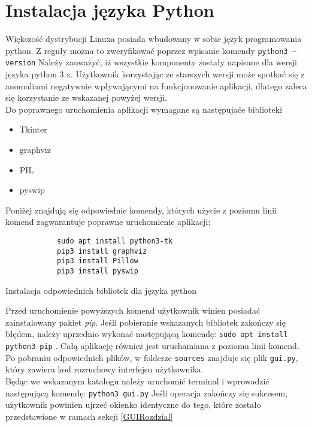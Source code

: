 \section{Instalacja języka Python}
    \label{InstallPython}
    Większość dystrybucji Linuxa posiada wbudowany w sobie język programowania python. Z reguły można to zweryfikować poprzez wpisanie komendy 
    \texttt{python3 --version}
    Należy zauważyć, iż wszystkie komponenty zostały napisane dla wersji języka python 3.x. Użytkownik korzystając ze starszych wersji 
    może spotkać się z anomaliami negatywnie wpływającymi na funkcjonowanie aplikacji, dlatego zaleca się korzystanie ze wskazanej powyżej wersji. \\
    Do poprawnego uruchomienia aplikacji wymagane są następujaće biblioteki 
    \begin{itemize}
        \item Tkinter
        \item graphviz 
        \item PIL
        \item pyswip
    \end{itemize}
    Poniżej znajdują się odpowiednie komendy, których użycie z poziomu linii komend zagwarantuje poprawne uruchomienie aplikacji:
    \begin{listing}[H]
        \begin{verbatim}
            sudo apt install python3-tk
            pip3 install graphviz
            pip3 install Pillow
            pip3 install pyswip
        \end{verbatim}
        \caption{Instalacja odpowiednich bibliotek dla języka python}
    \end{listing}
    Przed uruchomienie powyższych komend użytkownik winien posiadać zainstalowany pakiet \textit{pip}. Jeśli pobieranie wskazanych bibliotek zakończy 
    się błędem, należy uprzednio wykonać następującą komendę: \texttt{sudo apt install python3-pip} .
    Całą aplikację również jest uruchamiana z poziomu linii komend. Po pobraniu odpowiednich plików, w folderze \texttt{sources} znajduje się plik
    \texttt{gui.py}, który zawiera kod rozruchowy interfejsu użytkownika. \\
    Będąc we wskazanym katalogu należy uruchomić terminal i wprowadzić następującą
    komendę: \texttt{python3 gui.py}
    Jeśli operacja zakończy się sukcesem, użytkownik powinien ujrzeć okienko identyczne do tego, które zostało przedstawione w ramach sekcji \ref{GUIRozdzial}

